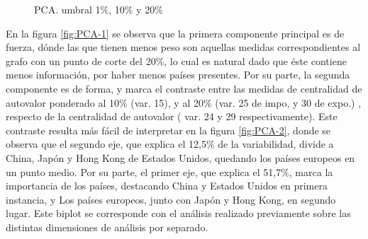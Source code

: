 \documentclass[runningheads,a4paper]{llncs}
\begin{document}
\begin{figure}
\centering
{}
\caption{PCA. umbral 1\%, 10\% y 20\%}
\label{fig:PCA}
\end{figure}

En la figura \ref{fig:PCA-1} se observa que la primera componente principal es de fuerza, dónde las que tienen menos peso son aquellas medidas correspondientes al grafo con  un punto de corte del 20\%, lo cual es natural dado que éste contiene menos información, por haber menos países presentes. Por su parte, la segunda componente es de forma, y marca el contraste entre las medidas de centralidad de autovalor ponderado al 10\% (var. 15), y al 20\% (var. 25 de impo, y 30 de expo.) , respecto de la centralidad de autovalor ( var. 24 y 29 respectivamente). Este contraste resulta más fácil de interpretar en la figura \ref{fig:PCA-2}, donde se observa que el segundo eje, que explica el 12,5\% de la variabilidad, divide a China, Japón y Hong Kong de Estados Unidos, quedando los países europeos en un punto medio. Por su parte, el primer eje, que explica el 51,7\%, marca la importancia de los países, destacando China y Estados Unidos en primera instancia, y Los países europeos, junto con Japón y Hong Kong, en segundo lugar. Este biplot se corresponde con el análisis realizado previamente sobre las distintas dimensiones de análisis por separado.                
\end{document}
